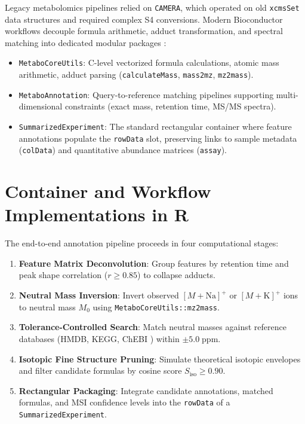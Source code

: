 \documentclass[11pt,twoside,openright]{book}
\begin{document}
Legacy metabolomics pipelines relied on \texttt{CAMERA}, which operated on old \texttt{xcmsSet} data structures and required complex S4 conversions. Modern Bioconductor workflows decouple formula arithmetic, adduct transformation, and spectral matching into dedicated modular packages \cite{rainer2022modular, huber2015orchestrating, smith2006xcms, tautenhahn2008centwave}:
\begin{itemize}
    \item \texttt{MetaboCoreUtils}: C-level vectorized formula calculations, atomic mass arithmetic, adduct parsing (\texttt{calculateMass}, \texttt{mass2mz}, \texttt{mz2mass}).
    \item \texttt{MetaboAnnotation}: Query-to-reference matching pipelines supporting multi-dimensional constraints (exact mass, retention time, MS/MS spectra).
    \item \texttt{SummarizedExperiment}: The standard rectangular container where feature annotations populate the \texttt{rowData} slot, preserving links to sample metadata (\texttt{colData}) and quantitative abundance matrices (\texttt{assay}).
\end{itemize}

\section{Container and Workflow Implementations in R}

The end-to-end annotation pipeline proceeds in four computational stages:
\begin{enumerate}
    \item \textbf{Feature Matrix Deconvolution}: Group features by retention time and peak shape correlation ($r \ge 0.85$) to collapse adducts.
    \item \textbf{Neutral Mass Inversion}: Invert observed $[M+\text{Na}]^+$ or $[M+\text{K}]^+$ ions to neutral mass $M_0$ using \texttt{MetaboCoreUtils::mz2mass}.
    \item \textbf{Tolerance-Controlled Search}: Match neutral masses against reference databases (HMDB, KEGG, ChEBI \cite{wishart2022hmdb, guijas2018metlin, horai2010massbank}) within $\pm 5.0\;\text{ppm}$.
    \item \textbf{Isotopic Fine Structure Pruning}: Simulate theoretical isotopic envelopes and filter candidate formulas by cosine score $S_{\text{iso}} \ge 0.90$.
    \item \textbf{Rectangular Packaging}: Integrate candidate annotations, matched formulas, and MSI confidence levels into the \texttt{rowData} of a \texttt{SummarizedExperiment}.
\end{enumerate}
\end{document}
